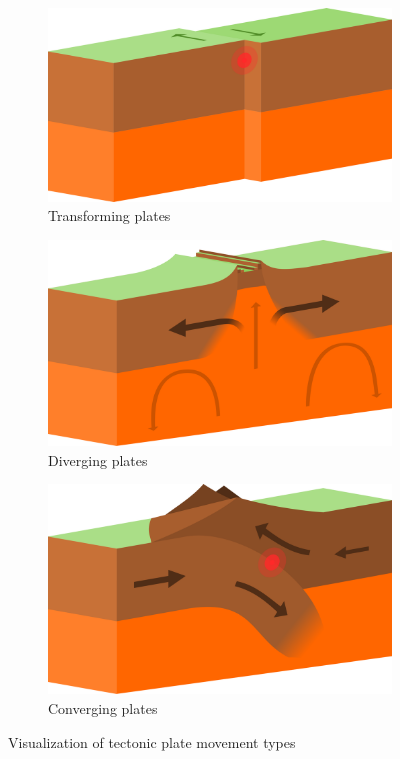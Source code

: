 \documentclass[11pt,a4paper,twoside,openright]{report}
\begin{document}
\begin{figure}[h]
  \centering
  \begin{subfigure}[b]{0.32\textwidth}
    \includegraphics[width=\textwidth]{tectonic-transform.png}
    \caption{Transforming plates}
    \label{fig:tectonictransform}
  \end{subfigure}
  \begin{subfigure}[b]{0.32\textwidth}
    \includegraphics[width=\textwidth]{tectonic-diverging.png}
    \caption{Diverging plates}
    \label{fig:tectonicdiverging}
  \end{subfigure}
  \begin{subfigure}[b]{0.32\textwidth}
    \includegraphics[width=\textwidth]{tectonic-converging.png}
    \caption{Converging plates}
    \label{fig:tectonicconverging}
  \end{subfigure}
  \caption{
    Visualization of tectonic plate movement types \cite{wiki:platetectonics}
  }
\end{figure}
\end{document}
